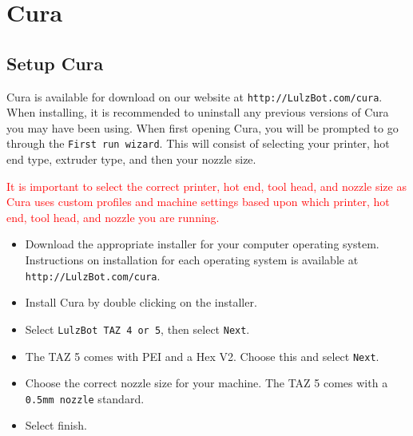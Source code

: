 %
%
%
%
%

\section{Cura}
\label{Cura}

\subsection{Setup Cura}
Cura is available for download on our website at \texttt{http://LulzBot.com/cura}. When installing, it is recommended to uninstall any previous versions of Cura you may have been using. 
When first opening Cura, you will be prompted to go through the \texttt{First run wizard}. This will consist of selecting your printer, hot end type, extruder type, and then your nozzle size.

\textcolor{red}{It is important to select the correct printer, hot end, tool head, and nozzle size as Cura uses custom profiles and machine settings based upon which printer, hot end, tool head, and nozzle you are running.}

\begin{itemize}
\item Download the appropriate installer for your computer operating system. Instructions on installation for each operating system is available at \texttt{http://LulzBot.com/cura}.
\item Install Cura by double clicking on the installer.
\item Select \texttt{LulzBot TAZ 4 or 5}, then select \texttt{Next}.
\item The TAZ 5 comes with PEI and a Hex V2. Choose this and select \texttt{Next}.
\item Choose the correct nozzle size for your machine. The TAZ 5 comes with a \texttt{0.5mm nozzle} standard.
\item Select finish.
\end{itemize}



